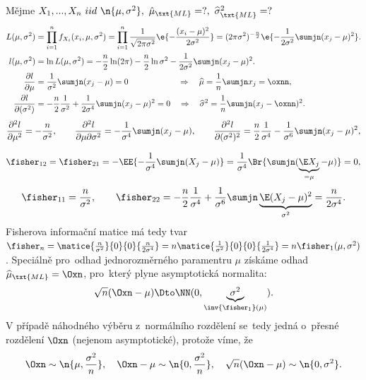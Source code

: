 \begin{example}
	Mějme $X_1,...,X_n~iid~\n{\mu,\sigma^2},~\hat{\mu}_\txt{ML}=?,~\widehat{\sigma}^{2}_\txt{ML}=?$
	\[
	\begin{split}
	L(\mu,\sigma^2)&=\prod\limits_{i=1}^n f_{X_i}(x_i,\mu,\sigma^2)=\prod\limits_{i=1}^n \frac{1}{\sqrt{2\pi\sigma^2}}\e{-\frac{(x_i-\mu)^2}{2\sigma^2}}=(2\pi\sigma^2)^{-\frac{n}{2}}\e{-\frac{1}{2\sigma^2}\sumjn(x_j-\mu)^2}.\\
	l(\mu,\sigma^2)&=\ln L(\mu,\sigma^2)=-\frac{n}{2}\ln(2\pi)-\frac{n}{2}\ln\sigma^2 -\frac{1}{2\sigma^2}\sumjn(x_j-\mu)^2.\\
	\frac{\partial l}{\partial \mu}&=\frac{1}{\sigma^2}\sumjn(x_j-\mu)=0\qquad\qquad\qquad\Rightarrow\quad\widehat{\mu}=\frac{1}{n}\sumjn x_j =\oxnn, \\
	\frac{\partial l}{\partial (\sigma^2)}&=-\frac{n}{2}\frac{1}{\sigma^2}+\frac{1}{2\sigma^4}\sumjn(x_j-\mu)^2=0\quad \Rightarrow\quad \widehat{\sigma}^2=\frac{1}{n}\sumjn (x_j-\oxnn)^2.
	\end{split}
	\]
	$$ \frac{\partial^2 l}{\partial\mu^2}=-\frac{n}{\sigma^2},\qquad\frac{\partial^2 l}{\partial\mu\partial\sigma^2}=-\frac{1}{\sigma^4}\sumjn (x_j-\mu),\qquad\frac{\partial^2 l}{\partial(\sigma^2)^2}=\frac{n}{2}\frac{1}{\sigma^4}-\frac{1}{\sigma^6}\sumjn(x_j-\mu)^2, $$
	
	$$ \fisher_{12}=\fisher_{21}=-\EE{ -\frac{1}{\sigma^4}\sumjn (X_j-\mu) }=\frac{1}{\sigma^4} \Br{\sumjn (\underbrace{\E X_j}_{=\mu}-\mu)} =0, $$
	$$  \fisher_{11}=\frac{n}{\sigma^2}, \qquad  \fisher_{22}=-\frac{n}{2}\frac{1}{\sigma^4}+\frac{1}{\sigma^6}\sumjn \underbrace{\E (X_j-\mu)^2}_{\sigma^2}=\frac{n}{2\sigma^4}. $$
	Fisherova informační matice má tedy tvar $\fisher_n=\matice{
		\frac{n}{\sigma^2}}{0}{0}{\frac{n}{2\sigma^4}}=n\matice{
		\frac{1}{\sigma^2}}{0}{0}{\frac{1}{2\sigma^4}}=n\fisher_1(\mu,\sigma^2)$.
	Speciálně pro~odhad jednorozměrného paramentru $\mu$ získáme odhad $\widehat{\mu}_\txt{ML}=\Oxn$, pro~který plyne asymptotická normalita:
	$$ \sqrt{n}(\Oxn-\mu)\Dto \NN(0,\underbrace{\sigma^2}_{\inv{\fisher_1}(\mu)}). $$	
	V případě náhodného výběru z~normálního rozdělení se~tedy jedná o~přesné rozdělení $\Oxn$ (nejenom asymptotické), protože víme, že
	$$ \Oxn\sim\n{\mu,\frac{\sigma^2}{n}},\quad \Oxn-\mu\sim\n{0,\frac{\sigma^2}{n}},\quad \sqrt{n}(\Oxn-\mu)\sim\n{0,\sigma^2}. $$

\end{example}
